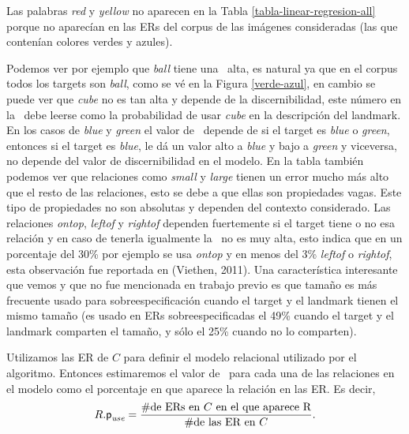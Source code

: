 Las palabras {\it red} y {\it yellow} no aparecen en la Tabla \ref{tabla-linear-regresion-all} porque no aparec\'ian en las ERs del corpus de las im\'agenes consideradas (las que conten\'ian colores verdes y azules).



Podemos ver por ejemplo que {\it ball} tiene una \puse\ alta, es natural ya que en el corpus todos los targets son {\it ball}, como se v\'e en la Figura \ref{verde-azul}, en cambio se puede ver que {\it cube} no es tan alta y depende de la discernibilidad, este n\'umero en la \puse\ debe leerse como la probabilidad de usar {\it cube} en la descripci\'on del landmark. En los casos de {\it blue} y {\it green} el valor de \puse\ depende de si el target es {\it blue} o {\it green}, entonces si el target es {\it blue}, le d\'a un valor alto a {\it blue} y bajo a {\it green} y viceversa, no depende del valor de discernibilidad en el modelo. En la tabla tambi\'en podemos ver que relaciones como {\it small} y {\it large} tienen un error mucho m\'as alto que el resto de las relaciones, esto se debe a que ellas son propiedades vagas. Este tipo de propiedades no son absolutas y dependen del contexto considerado.
Las relaciones {\it ontop}, {\it leftof} y {\it rightof} dependen fuertemente si el target tiene o no esa relaci\'on y en caso de tenerla igualmente la \puse\ no es muy alta, esto indica que en un porcentaje del 30\% por ejemplo se usa {\it ontop} y en menos del 3\% {\it leftof} o {\it rightof}, esta observaci\'on fue reportada en (Viethen, 2011). Una caracter\'istica interesante que vemos y que no fue mencionada en trabajo previo es que tama\~no es m\'as frecuente usado para sobreespecificaci\'on cuando el target y el landmark tienen el mismo tama\~no 
(es usado en ERs sobreespecificadas el 49\% cuando el target y el landmark comparten el tama\~no, y s\'olo el 25\% cuando no lo comparten).

 Utilizamos las ER de $C$
para definir el modelo relacional utilizado por el algoritmo. Entonces 
estimaremos el valor de \puse\ para cada una de las relaciones en el modelo como el
porcentaje en que aparece la relaci\'on en las ER. Es decir,
\begin{equation} \label{eq1}
R.\textsf{p}_\textit{use} = \frac {\#\mbox{de ERs en $C$ en el que aparece R}} {\#\mbox{de las ER en $C$}}.
\end{equation}

